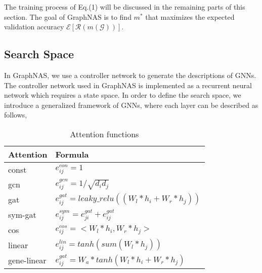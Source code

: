 \documentclass{article}
\begin{document}
The training process of Eq.(1) will be discussed in the remaining parts of this section. The goal of GraphNAS is to find $m^{*}$ that maximizes the expected validation accuracy $ \mathcal{E}[\mathcal{R}(m(\mathcal{G}))]$.


\subsection{Search Space}
\label{Search Space}
In GraphNAS, we use a controller network to generate the descriptions of GNNs. The controller network used in GraphNAS is implemented as a recurrent neural network which requires a state space. In order to define the search space, we introduce a generalized framework of GNNs, where each layer can be described as follows, 
\begin{table}[]
	\caption{Attention functions }
	\label{operators}
	\begin{tabular}{l|l}
		\hline
		Attention & Formula \\ \hline
		const & $e_{ij}^{con} = 1$ \\ \hline
		gcn & $e^{gcn}_{ij} = 1/\sqrt{d_{i}d_{j}}$ \\ \hline
		gat &	$e_{ij}^{gat} = leaky\_relu((W_{l} *h_{i} + W_{r} *h_{j}))$   \\ \hline
		sym-gat  &	$e_{ij}^{sym} = e_{ji}^{gat} + e_{ij}^{gat} $   \\ \hline
		cos &	$e_{ij}^{cos} =  <W_{l} *h_{i} , W_{r} *h_{j}>$   \\ \hline
		linear &	$e_{ij}^{lin} = tanh(sum (W_{l} *h_{j} ) )$   \\ \hline
		gene-linear &	$e_{ij}^{gat} = W_{a}*tanh(W_{l} *h_{i} + W_{r} *h_{j} )$   \\ \hline
		
	\end{tabular}
\end{table}
\end{document}
